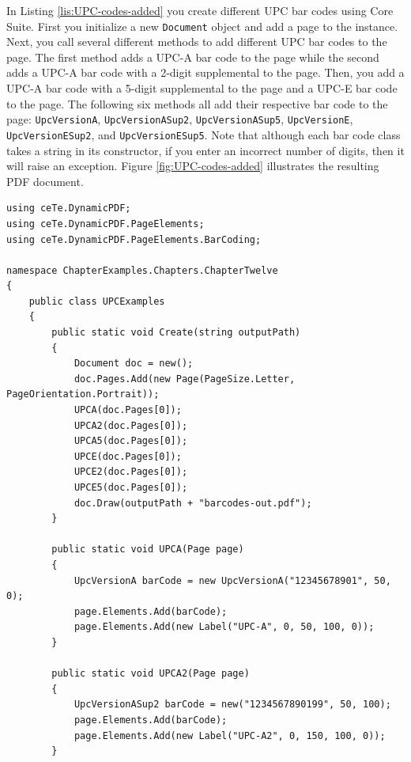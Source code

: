 \documentclass[american,letterpaper]{tufte-book}
\numberwithin{equation}{section}
\numberwithin{figure}{section}
\begin{document}
{In Listing \ref{lis:UPC-codes-added} you create different UPC bar
codes using Core Suite. First you initialize a new \texttt{Document}
object and add a page to the instance. Next, you call several different
methods to add different UPC bar codes to the page. The first method
adds a UPC-A bar code to the page while the second adds a UPC-A bar
code with a 2-digit supplemental to the page. Then, you add a UPC-A
bar code with a 5-digit supplemental to the page and a UPC-E bar code
to the page. The following six methods all add their respective bar
code to the page: \texttt{UpcVersionA}, \texttt{UpcVersionASup2},
\texttt{UpcVersionASup5}, \texttt{UpcVersionE}, \texttt{UpcVersionESup2},
and \texttt{UpcVersionESup5}. Note that although each bar code class
takes a string in its constructor, if you enter an incorrect number
of digits, then it will raise an exception. Figure \ref{fig:UPC-codes-added}
illustrates the resulting PDF document.

\bgroup{}
\begin{lstlisting}[caption={UPC codes added to a PDF document.},label={lis:UPC-codes-added},basicstyle={\small\ttfamily},breaklines=true]
using ceTe.DynamicPDF;
using ceTe.DynamicPDF.PageElements;
using ceTe.DynamicPDF.PageElements.BarCoding;

namespace ChapterExamples.Chapters.ChapterTwelve
{
    public class UPCExamples
    {
        public static void Create(string outputPath)
        {
            Document doc = new();
            doc.Pages.Add(new Page(PageSize.Letter, PageOrientation.Portrait));
            UPCA(doc.Pages[0]);
            UPCA2(doc.Pages[0]);
            UPCA5(doc.Pages[0]);
            UPCE(doc.Pages[0]);
            UPCE2(doc.Pages[0]);
            UPCE5(doc.Pages[0]);
            doc.Draw(outputPath + "barcodes-out.pdf");
        }

        public static void UPCA(Page page)
        {
            UpcVersionA barCode = new UpcVersionA("12345678901", 50, 0);
            page.Elements.Add(barCode);
            page.Elements.Add(new Label("UPC-A", 0, 50, 100, 0));
        } 

        public static void UPCA2(Page page)
        {
            UpcVersionASup2 barCode = new("1234567890199", 50, 100);
            page.Elements.Add(barCode);
            page.Elements.Add(new Label("UPC-A2", 0, 150, 100, 0));
        }


\end{lstlisting}}
\end{document}
